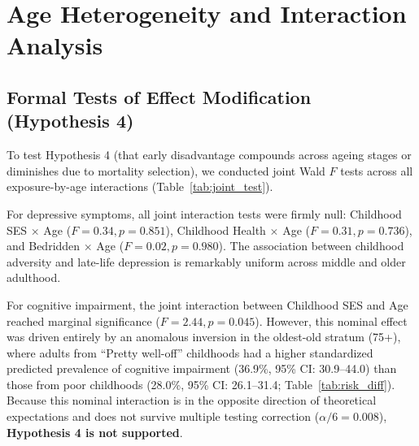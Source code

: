 \documentclass[11pt,a4paper]{article}
\begin{document}
\section{Age Heterogeneity and Interaction Analysis}


\subsection{Formal Tests of Effect Modification (Hypothesis 4)}
To test Hypothesis 4 (that early disadvantage compounds across ageing stages or diminishes due to mortality selection), we conducted joint Wald $F$ tests across all exposure-by-age interactions (Table~\ref{tab:joint_test}).

For depressive symptoms, all joint interaction tests were firmly null: Childhood SES $\times$ Age ($F = 0.34, p = 0.851$), Childhood Health $\times$ Age ($F = 0.31, p = 0.736$), and Bedridden $\times$ Age ($F = 0.02, p = 0.980$). The association between childhood adversity and late-life depression is remarkably uniform across middle and older adulthood.

For cognitive impairment, the joint interaction between Childhood SES and Age reached marginal significance ($F = 2.44, p = 0.045$). However, this nominal effect was driven entirely by an anomalous inversion in the oldest-old stratum (75+), where adults from ``Pretty well-off'' childhoods had a higher standardized predicted prevalence of cognitive impairment (36.9\%, 95\% CI: 30.9--44.0) than those from poor childhoods (28.0\%, 95\% CI: 26.1--31.4; Table~\ref{tab:risk_diff}). Because this nominal interaction is in the opposite direction of theoretical expectations and does not survive multiple testing correction ($\alpha / 6 = 0.008$), \textbf{Hypothesis 4 is not supported}.
\end{document}
